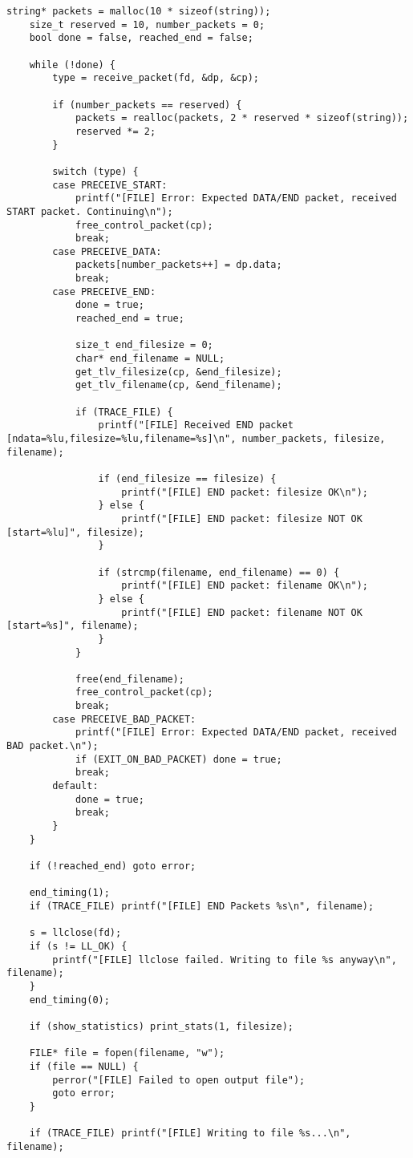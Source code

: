 \documentclass[subfiles]{main.tex}
\begin{document}
\begin{lstlisting}[style=rcom]
	string* packets = malloc(10 * sizeof(string));
	size_t reserved = 10, number_packets = 0;
	bool done = false, reached_end = false;
	
	while (!done) {
		type = receive_packet(fd, &dp, &cp);
		
		if (number_packets == reserved) {
			packets = realloc(packets, 2 * reserved * sizeof(string));
			reserved *= 2;
		}
		
		switch (type) {
		case PRECEIVE_START:
			printf("[FILE] Error: Expected DATA/END packet, received START packet. Continuing\n");
			free_control_packet(cp);
			break;
		case PRECEIVE_DATA:
			packets[number_packets++] = dp.data;
			break;
		case PRECEIVE_END:
			done = true;
			reached_end = true;
			
			size_t end_filesize = 0;
			char* end_filename = NULL;
			get_tlv_filesize(cp, &end_filesize);
			get_tlv_filename(cp, &end_filename);
			
			if (TRACE_FILE) {
				printf("[FILE] Received END packet [ndata=%lu,filesize=%lu,filename=%s]\n", number_packets, filesize, filename);
				
				if (end_filesize == filesize) {
					printf("[FILE] END packet: filesize OK\n");
				} else {
					printf("[FILE] END packet: filesize NOT OK [start=%lu]", filesize);
				}
			
				if (strcmp(filename, end_filename) == 0) {
					printf("[FILE] END packet: filename OK\n");
				} else {
					printf("[FILE] END packet: filename NOT OK [start=%s]", filename);
				}
			}
	
			free(end_filename);
			free_control_packet(cp);
			break;
		case PRECEIVE_BAD_PACKET:
			printf("[FILE] Error: Expected DATA/END packet, received BAD packet.\n");
			if (EXIT_ON_BAD_PACKET) done = true;
			break;
		default:
			done = true;
			break;
		}
	}

	if (!reached_end) goto error;
	
	end_timing(1);
	if (TRACE_FILE) printf("[FILE] END Packets %s\n", filename);
	
	s = llclose(fd);
	if (s != LL_OK) {
		printf("[FILE] llclose failed. Writing to file %s anyway\n", filename);
	}
	end_timing(0);
	
	if (show_statistics) print_stats(1, filesize);
	
	FILE* file = fopen(filename, "w");
	if (file == NULL) {
		perror("[FILE] Failed to open output file");
		goto error;
	}
	
	if (TRACE_FILE) printf("[FILE] Writing to file %s...\n", filename);
	

\end{lstlisting}
\end{document}
